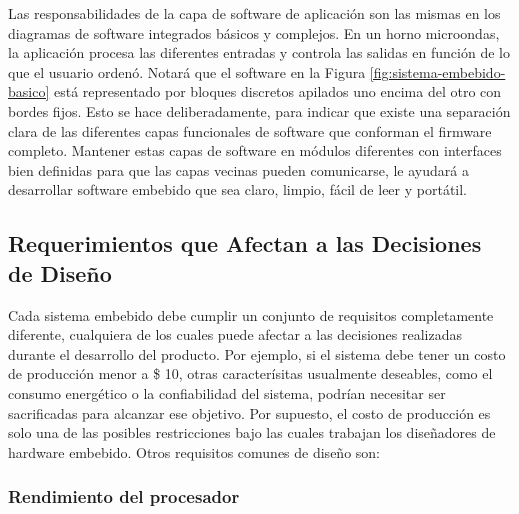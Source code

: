 \documentclass[output=paper, 
colorlinks,
citecolor=brown,
newtxmath
]{langscibook}
\begin{document}
Las responsabilidades de la capa de software de aplicación son las mismas 
en los diagramas de software integrados básicos y complejos. 
En un horno microondas, la aplicación procesa las diferentes entradas 
y controla las salidas en función de lo que el usuario ordenó.
Notará que el software en la Figura \ref{fig:sistema-embebido-basico} está representado por bloques 
discretos apilados uno encima del otro con bordes fijos. Esto se hace deliberadamente, 
para indicar que existe una separación clara de las diferentes capas funcionales 
de software que conforman el firmware completo. 
Mantener estas capas de software en módulos diferentes con interfaces bien definidas para 
que las capas vecinas pueden comunicarse, le ayudará a desarrollar software embebido 
que sea claro, limpio, fácil de leer y portátil.



\subsection {Requerimientos que Afectan a las Decisiones de Diseño}



Cada sistema embebido debe cumplir un conjunto de requisitos completamente 
diferente, cualquiera de los cuales puede afectar a las decisiones realizadas durante el 
desarrollo del producto. Por ejemplo, si el sistema debe tener un costo de producción menor a 
\$ 10, otras caracterísitas usualmente deseables, como el consumo energético o
la confiabilidad del sistema, podrían necesitar ser sacrificadas para alcanzar ese objetivo.
Por supuesto, el costo de producción es solo una de las posibles restricciones 
bajo las cuales trabajan los diseñadores de hardware embebido. Otros requisitos comunes 
de diseño son:



\subsubsection {Rendimiento del procesador}
\end{document}
